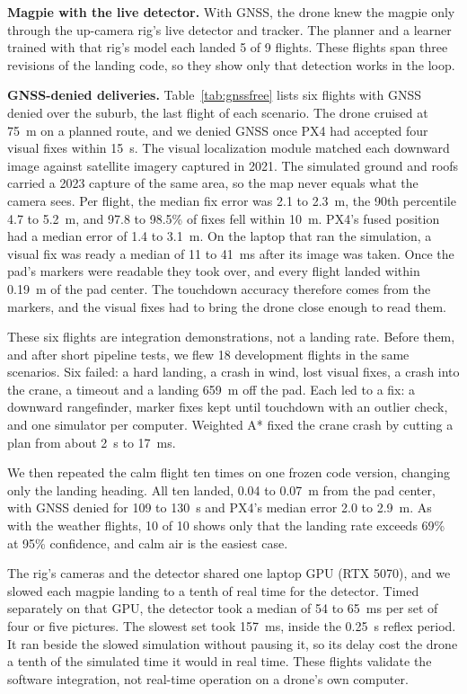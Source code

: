 \textbf{Magpie with the live detector.} With GNSS, the drone knew the magpie only through the up-camera rig's live detector and tracker. The planner and a learner trained with that rig's model each landed 5 of 9 flights. These flights span three revisions of the landing code, so they show only that detection works in the loop.



\textbf{GNSS-denied deliveries.} Table~\ref{tab:gnssfree} lists six flights with GNSS denied over the suburb, the last flight of each scenario. The drone cruised at 75~m on a planned route, and we denied GNSS once PX4 had accepted four visual fixes within 15~s. The visual localization module matched each downward image against satellite imagery captured in 2021. The simulated ground and roofs carried a 2023 capture of the same area, so the map never equals what the camera sees. Per flight, the median fix error was 2.1 to 2.3~m, the 90th percentile 4.7 to 5.2~m, and 97.8 to 98.5\% of fixes fell within 10~m. PX4's fused position had a median error of 1.4 to 3.1~m. On the laptop that ran the simulation, a visual fix was ready a median of 11 to 41~ms after its image was taken. Once the pad's markers were readable they took over, and every flight landed within 0.19~m of the pad center. The touchdown accuracy therefore comes from the markers, and the visual fixes had to bring the drone close enough to read them.

These six flights are integration demonstrations, not a landing rate. Before them, and after short pipeline tests, we flew 18 development flights in the same scenarios. Six failed: a hard landing, a crash in wind, lost visual fixes, a crash into the crane, a timeout and a landing 659~m off the pad. Each led to a fix: a downward rangefinder, marker fixes kept until touchdown with an outlier check, and one simulator per computer. Weighted A* fixed the crane crash by cutting a plan from about 2~s to 17~ms.

We then repeated the calm flight ten times on one frozen code version, changing only the landing heading. All ten landed, 0.04 to 0.07~m from the pad center, with GNSS denied for 109 to 130~s and PX4's median error 2.0 to 2.9~m. As with the weather flights, 10 of 10 shows only that the landing rate exceeds 69\% at 95\% confidence, and calm air is the easiest case.

The rig's cameras and the detector shared one laptop GPU (RTX 5070), and we slowed each magpie landing to a tenth of real time for the detector. Timed separately on that GPU, the detector took a median of 54 to 65~ms per set of four or five pictures. The slowest set took 157~ms, inside the 0.25~s reflex period. It ran beside the slowed simulation without pausing it, so its delay cost the drone a tenth of the simulated time it would in real time. These flights validate the software integration, not real-time operation on a drone's own computer.
